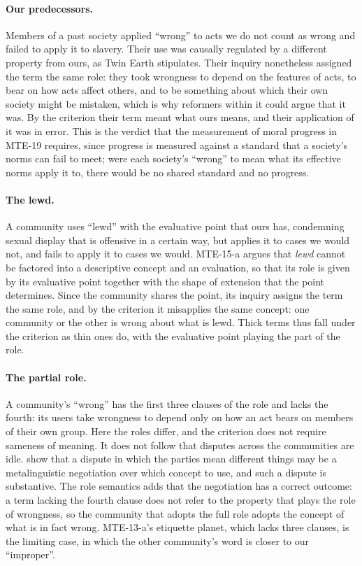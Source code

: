 \documentclass{situationist-preprint}
\begin{document}
\paragraph{Our predecessors.} Members of a past society applied \enquote{wrong} to acts we do not count as wrong and failed to apply it to slavery. Their use was causally regulated by a different property from ours, as Twin Earth stipulates. Their inquiry nonetheless assigned the term the same role: they took wrongness to depend on the features of acts, to bear on how acts affect others, and to be something about which their own society might be mistaken, which is why reformers within it could argue that it was. By the criterion their term meant what ours means, and their application of it was in error. This is the verdict that the measurement of moral progress in MTE-19 requires, since progress is measured against a standard that a society's norms can fail to meet; were each society's \enquote{wrong} to mean what its effective norms apply it to, there would be no shared standard and no progress.

\paragraph{The lewd.} A community uses \enquote{lewd} with the evaluative point that ours has, condemning sexual display that is offensive in a certain way, but applies it to cases we would not, and fails to apply it to cases we would. MTE-15-a argues that \emph{lewd} cannot be factored into a descriptive concept and an evaluation, so that its role is given by its evaluative point together with the shape of extension that the point determines. Since the community shares the point, its inquiry assigns the term the same role, and by the criterion it misapplies the same concept: one community or the other is wrong about what is lewd. Thick terms thus fall under the criterion as thin ones do, with the evaluative point playing the part of the role.

\paragraph{The partial role.} A community's \enquote{wrong} has the first three clauses of the role and lacks the fourth: its users take wrongness to depend only on how an act bears on members of their own group. Here the roles differ, and the criterion does not require sameness of meaning. It does not follow that disputes across the communities are idle. \citet{PlunkettSundell2013} show that a dispute in which the parties mean different things may be a metalinguistic negotiation over which concept to use, and such a dispute is substantive. The role semantics adds that the negotiation has a correct outcome: a term lacking the fourth clause does not refer to the property that plays the role of wrongness, so the community that adopts the full role adopts the concept of what is in fact wrong. MTE-13-a's etiquette planet, which lacks three clauses, is the limiting case, in which the other community's word is closer to our \enquote{improper}.
\end{document}
